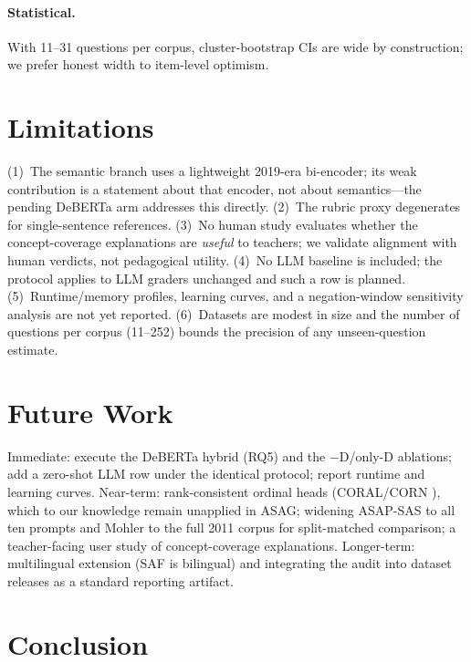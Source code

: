 \documentclass[11pt]{article}
\begin{document}
\paragraph{Statistical.} With 11--31 questions per corpus, cluster-bootstrap
CIs are wide by construction; we prefer honest width to item-level optimism.

\section{Limitations}
\label{sec:limitations}

(1)~The semantic branch uses a lightweight 2019-era bi-encoder; its weak
contribution is a statement about that encoder, not about semantics---the
pending DeBERTa arm addresses this directly. (2)~The rubric proxy degenerates
for single-sentence references. (3)~No human study evaluates whether the
concept-coverage explanations are \emph{useful} to teachers; we validate
alignment with human verdicts, not pedagogical utility. (4)~No LLM baseline is
included; the protocol applies to LLM graders unchanged and such a row is
planned. (5)~Runtime/memory profiles, learning curves, and a negation-window
sensitivity analysis are not yet reported. (6)~Datasets are modest in size and
the number of questions per corpus (11--252) bounds the precision of any
unseen-question estimate.

\section{Future Work}
\label{sec:future}

Immediate: execute the DeBERTa hybrid (RQ5) and the $-$D/only-D ablations;
add a zero-shot LLM row under the identical protocol; report runtime and
learning curves. Near-term: rank-consistent ordinal heads (CORAL/CORN
\cite{cao2020coral,shi2023corn}), which to our knowledge remain unapplied in
ASAG; widening ASAP-SAS to all ten prompts and Mohler to the full 2011 corpus
for split-matched comparison; a teacher-facing user study of concept-coverage
explanations. Longer-term: multilingual extension (SAF is bilingual) and
integrating the audit into dataset releases as a standard reporting artifact.

\section{Conclusion}
\label{sec:conclusion}
\end{document}
